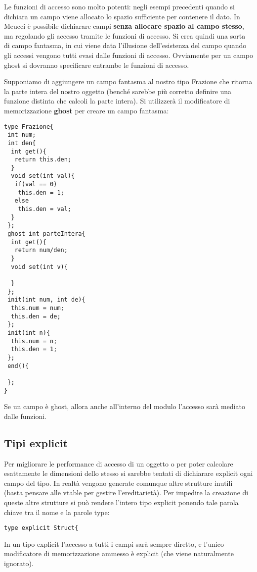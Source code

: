 \documentclass[10pt]{book}%
\newcommand{\e}{\`{e} }
\newcommand{\ac}[1]{\`{#1}}
\renewcommand{\emph}[1]{\textbf{#1}}
\newenvironment{codeenv}{
\begin{mdframed}[backgroundcolor=black!20,topline=false,leftline=false,rightline=false,bottomline=false]
}
{\end{mdframed}}
\begin{document}
Le funzioni di accesso sono molto potenti: negli esempi precedenti quando si dichiara un campo viene allocato lo spazio sufficiente per contenere il dato. In Meucci \e possibile dichiarare campi \emph{senza allocare spazio al campo stesso}, ma regolando gli accesso tramite le funzioni di accesso. Si crea quindi una sorta di campo fantasma, in cui viene data l'illusione dell'esistenza del campo quando gli accessi vengono tutti evasi dalle funzioni di accesso. Ovviamente per un campo ghost si dovranno specificare entrambe le funzioni di accesso.

Supponiamo di aggiungere un campo fantasma al nostro tipo Frazione che ritorna la parte intera del nostro oggetto (bench\'e sarebbe pi\ac u corretto definire una funzione distinta che calcoli la parte intera). Si utilizzer\ac a il modificatore di memorizzazione \emph{ghost} per creare un campo fantasma:
\begin{codeenv}
\begin{verbatim}
type Frazione{
 int num;
 int den{
  int get(){
   return this.den;
  }
  void set(int val){
   if(val == 0)
    this.den = 1;
   else
    this.den = val;
  }
 };
 ghost int parteIntera{
  int get(){
   return num/den;
  }
  void set(int v){
  
  }
 };
 init(int num, int de){
  this.num = num;
  this.den = de;
 };
 init(int n){
  this.num = n;
  this.den = 1;
 };
 end(){
 
 };
}
\end{verbatim}
\end{codeenv}
Se un campo \e ghost, allora anche all'interno del modulo l'accesso sar\ac a mediato dalle funzioni.

\subsection{Tipi explicit}
Per migliorare le performance di accesso di un oggetto o per poter calcolare esattamente le dimensioni dello stesso si sarebbe tentati di dichiarare explicit ogni campo del tipo. In realt\ac a vengono generate comunque altre strutture inutili (basta pensare alle vtable per gestire l'ereditariet\ac a). Per impedire la creazione di queste altre strutture si pu\ac o rendere l'intero tipo explicit ponendo tale parola chiave tra il nome e la parole type:
\begin{codeenv}
\begin{verbatim}
type explicit Struct{
\end{verbatim}
\end{codeenv}
In un tipo explicit l'accesso a tutti i campi sar\ac a sempre diretto, e l'unico modificatore di memorizzazione ammesso \e explicit (che viene naturalmente ignorato).
 
\end{document}
